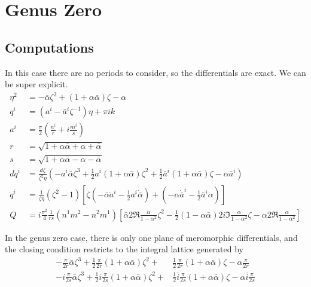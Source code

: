 
\section{Genus Zero}
\label{sec:Genus Zero}
\subsection{Computations}

In this case there are no periods to consider, so the differentials are exact. We can be super explicit.
\begin{align*}
\eta^2 &= -\bar\alpha \zeta^2 + (1+\alpha\bar\alpha)\zeta - \alpha \\
q^i &= (a^i - \bar a^i \zeta^{-1})\eta + \pi i k \\
a^i &= \frac{\pi}{2}\left( \frac{n^i}{r} + i \frac{m^i}{s} \right) \\
r &= \sqrt{1 + \alpha\bar\alpha + \alpha + \bar\alpha} \\
s &= \sqrt{1 + \alpha\bar\alpha - \alpha - \bar\alpha} \\
dq^i &= \frac{d\zeta}{\zeta^2\eta} \left( -a^i\bar\alpha\zeta^3 + \frac{1}{2}a^i(1+\alpha\bar\alpha)\zeta^2 + \frac{1}{2}\bar a^i(1+\alpha\bar\alpha)\zeta  - \alpha\bar a^i\right) \\
\dot q^i &= \frac{1}{\zeta\eta}(\zeta^2-1)\left[ \zeta(-\bar\alpha\dot a^i - \frac{1}{2} a^i \dot{\bar\alpha}) + (-\alpha\dot {\bar a}^i - \frac{1}{2} \bar a^i \dot\alpha) \right]\\
Q &= i \frac{\pi^2}{4}\frac{1}{rs}(n^1m^2-n^2m^1) \left[ \bar\alpha 2\Re \frac{\dot\alpha}{1-\alpha^2}\zeta^2 - \frac{1}{2}(1-\alpha\bar\alpha)2i\Im \frac{\dot\alpha}{1-\alpha^2} \zeta - \alpha 2\Re \frac{\dot\alpha}{1-\alpha^2}\right]
\end{align*}

In the genus zero case, there is only one plane of meromorphic differentials, and the closing condition restricts to the integral lattice generated by
\begin{align*}
-\frac{\pi}{2r}\bar\alpha\zeta^3 + \frac{1}{2}\frac{\pi}{2r}(1+\alpha\bar\alpha)\zeta^2 +& \frac{1}{2}\frac{\pi}{2r}(1+\alpha\bar\alpha)\zeta  - \alpha\frac{\pi}{2r} \\
-i\frac{\pi}{2s}\bar\alpha\zeta^3 + \frac{1}{2}i\frac{\pi}{2s}(1+\alpha\bar\alpha)\zeta^2 +& \frac{1}{2}\bar i\frac{\pi}{2s}(1+\alpha\bar\alpha)\zeta  - \alpha\bar i\frac{\pi}{2s}
\end{align*}

